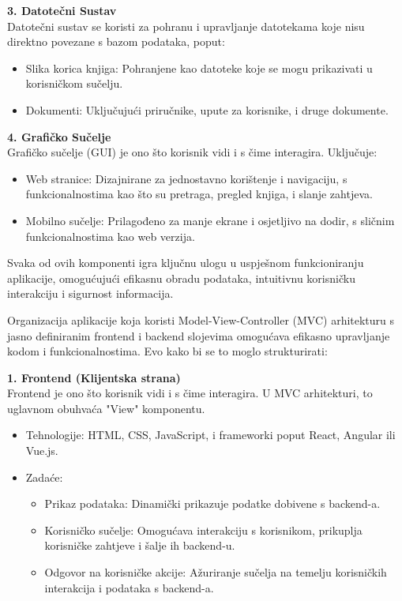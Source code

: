  \textbf{3. Datotečni Sustav}\\

Datotečni sustav se koristi za pohranu i upravljanje datotekama koje nisu direktno povezane s bazom podataka, poput:
\begin{itemize}
		  \item {Slika korica knjiga: Pohranjene kao datoteke koje se mogu prikazivati u korisničkom sučelju.}
		  \item {Dokumenti: Uključujući priručnike, upute za korisnike, i druge dokumente.}
	   \end{itemize}

 \textbf{4. Grafičko Sučelje}\\

Grafičko sučelje (GUI) je ono što korisnik vidi i s čime interagira. Uključuje:
\begin{itemize}
		  \item {Web stranice: Dizajnirane za jednostavno korištenje i navigaciju, s funkcionalnostima kao što su pretraga, pregled knjiga, i slanje zahtjeva.}
		  \item {Mobilno sučelje: Prilagođeno za manje ekrane i osjetljivo na dodir, s sličnim funkcionalnostima kao web verzija.}	
	   \end{itemize}

Svaka od ovih komponenti igra ključnu ulogu u uspješnom funkcioniranju aplikacije, omogućujući efikasnu obradu podataka, intuitivnu korisničku interakciju i sigurnost informacija.



Organizacija aplikacije koja koristi Model-View-Controller (MVC) arhitekturu s jasno definiranim frontend i backend slojevima omogućava efikasno upravljanje kodom i funkcionalnostima. Evo kako bi se to moglo strukturirati:

 \textbf{1. Frontend (Klijentska strana)}\\

Frontend je ono što korisnik vidi i s čime interagira. U MVC arhitekturi, to uglavnom obuhvaća "View" komponentu.
\begin{itemize}
		  \item {Tehnologije: HTML, CSS, JavaScript, i frameworki poput React, Angular ili Vue.js.}
		  \item {Zadaće:
    \begin{itemize}
		  \item {Prikaz podataka: Dinamički prikazuje podatke dobivene s backend-a.}
		  \item {Korisničko sučelje: Omogućava interakciju s korisnikom, prikuplja korisničke zahtjeve i šalje ih backend-u.}	
            \item {Odgovor na korisničke akcije: Ažuriranje sučelja na temelju korisničkih interakcija i podataka s backend-a.}
	   \end{itemize}}	
            
	   \end{itemize}


